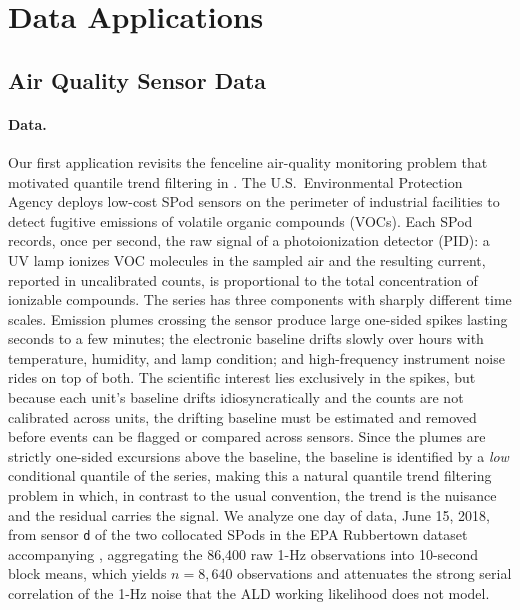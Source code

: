\section{Data Applications}
\label{sec:applications}

\subsection{Air Quality Sensor Data}
\label{sec:app:spod}

\paragraph{Data.} Our first application revisits the fenceline air-quality monitoring problem that motivated quantile trend filtering in \citet{brantley2020baseline}. The U.S.\ Environmental Protection Agency deploys low-cost SPod sensors on the perimeter of industrial facilities to detect fugitive emissions of volatile organic compounds (VOCs). Each SPod records, once per second, the raw signal of a photoionization detector (PID): a UV lamp ionizes VOC molecules in the sampled air and the resulting current, reported in uncalibrated counts, is proportional to the total concentration of ionizable compounds. The series has three components with sharply different time scales. Emission plumes crossing the sensor produce large one-sided spikes lasting seconds to a few minutes; the electronic baseline drifts slowly over hours with temperature, humidity, and lamp condition; and high-frequency instrument noise rides on top of both. The scientific interest lies exclusively in the spikes, but because each unit's baseline drifts idiosyncratically and the counts are not calibrated across units, the drifting baseline must be estimated and removed before events can be flagged or compared across sensors. Since the plumes are strictly one-sided excursions above the baseline, the baseline is identified by a \emph{low} conditional quantile of the series, making this a natural quantile trend filtering problem in which, in contrast to the usual convention, the trend is the nuisance and the residual carries the signal. We analyze one day of data, June 15, 2018, from sensor \texttt{d} of the two collocated SPods in the EPA Rubbertown dataset accompanying \citet{brantley2020baseline}, aggregating the 86{,}400 raw 1-Hz observations into 10-second block means, which yields $n = 8{,}640$ observations and attenuates the strong serial correlation of the 1-Hz noise that the ALD working likelihood does not model.

